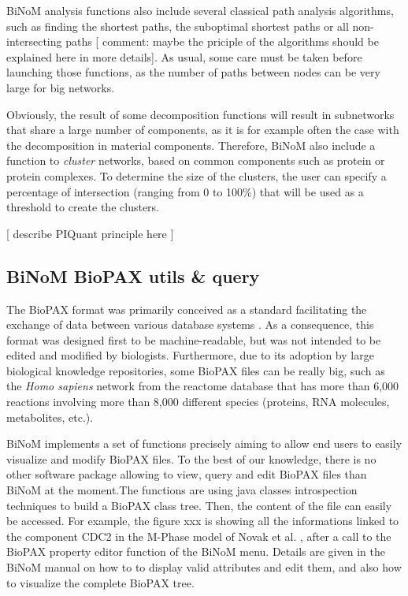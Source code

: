 \documentclass[10pt]{bmc_article}
\newenvironment{bmcformat}{\baselineskip20pt\sloppy\setboolean{publ}{false}}{\baselineskip20pt\sloppy}
\begin{document}
\begin{bmcformat}
BiNoM analysis functions also include several classical path analysis
algorithms, such as finding the shortest paths, the suboptimal shortest paths or
all non-intersecting paths [ comment: maybe the priciple of the algorithms
should be explained here in more details]. As usual, some care must be taken
before launching those functions, as the number of paths between nodes can be
very large for big networks.

Obviously, the result of some decomposition functions will result in subnetworks
that share a large number of components, as it is for example often the case
with the decomposition in material components. Therefore, BiNoM also include a
function to \emph{cluster} networks, based on common components such as protein
or protein complexes. To determine the size of the clusters, the user can
specify a percentage of intersection (ranging from 0 to 100\%) that will be used
as a threshold to create the clusters.

[ describe PIQuant principle here ]

\subsection*{BiNoM BioPAX utils \& query}
The BioPAX format was primarily conceived as a standard facilitating the
exchange of data between various database systems \cite{demir2010biopax}. As a
consequence, this format was designed first to be machine-readable, but was not
intended
to be edited and modified by biologists. Furthermore, due to its adoption by
large biological knowledge repositories, some BioPAX files can be really big,
such as the \textit{Homo sapiens} network from the reactome database
\cite{joshi2005reactome} that has more than 6,000 reactions involving more than
8,000 different species (proteins, RNA molecules, metabolites, etc.).

BiNoM implements a set of functions precisely aiming to allow end users to
easily visualize and modify BioPAX files. To the best of our knowledge, there is
no other software package allowing to view, query and edit BioPAX files than
BiNoM at the moment.The functions are using
java classes introspection techniques to build a BioPAX class tree. Then, the
content of the file can easily be accessed. For example, the figure xxx is
showing all the informations linked to the component CDC2 in the M-Phase model
of Novak et al. \cite{novak1998model}, after a call to the BioPAX property
editor function of the BiNoM menu. Details are given in the BiNoM manual on how
to to display valid attributes and edit them, and also how to visualize the
complete BioPAX tree.


\end{bmcformat}
\end{document}
